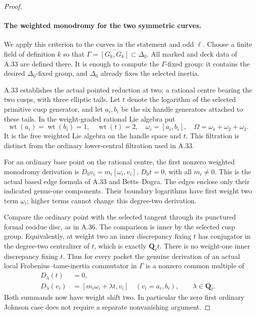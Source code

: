 \begin{proof}
\paragraph{The weighted monodromy for the two symmetric curves.}
We apply this criterion to the curves in the statement
and odd \(\ell\). Choose a finite field of definition
\(k\) so that
\(\Gamma=\overline{[G_k,G_k]}\subset\Delta_0\).
All marked and deck data of A.33 are defined there.
It is enough to compute the \(\Gamma\)-fixed group:
it contains the desired \(\Delta_0\)-fixed group,
and \(\Delta_0\) already fixes the selected inertia.

A.33 establishes the actual pointed reduction at
two: a rational centre bearing the two cusps, with
three elliptic tails. Let \(t\) denote the logarithm
of the selected primitive cusp generator, and let
\(a_i,b_i\) be the six handle generators attached
to these tails. In the weight-graded rational Lie
algebra put
\[
 \operatorname{wt}(a_i)=\operatorname{wt}(b_i)=1,
 \quad \operatorname{wt}(t)=2,
 \quad \omega_i=[a_i,b_i],\quad
 \Omega=\omega_1+\omega_2+\omega_3.                  \tag{A.38.5}
\]
It is the free weighted Lie algebra on the handle
space and \(t\). This filtration is distinct from
the ordinary lower-central filtration used in A.33.

For an ordinary base point on the rational centre,
the first nonzero weighted monodromy derivation is
\(D_0v_i=m_i[\omega_i,v_i]\), \(D_0t=0\), with
all \(m_i\ne0\). This is the actual based edge
formula of A.33 and Betts--Dogra. The edges enclose
only their indicated genus-one components. Their
boundary logarithms have first weight two term
\(\omega_i\); higher terms cannot change this
degree-two derivation.

Compare the ordinary point with the selected tangent
through its punctured formal residue disc, as in A.36.
The comparison is inner by the selected cusp group.
Equivalently, at weight two an inner discrepancy
fixing \(t\) has conjugator in the degree-two
centralizer of \(t\), which is exactly
\(\mathbf Q_\ell t\). There is no weight-one
inner discrepancy fixing \(t\). Thus for every
packet the genuine derivation of an actual local
Frobenius--tame-inertia commutator in \(\Gamma\)
is a nonzero common multiple of
\[
 \begin{split}
 D_\lambda(t)&=0,\\
 D_\lambda(v_i)&=[m_i\omega_i+\lambda t,v_i]
       \quad(v_i=a_i,b_i),
 \qquad\lambda\in\mathbf Q_\ell.
 \end{split}
                                                        \tag{A.38.6}
\]
Both summands now have weight shift two. In
particular the zero first ordinary Johnson case
does not require a separate nonvanishing argument.


\end{proof}
